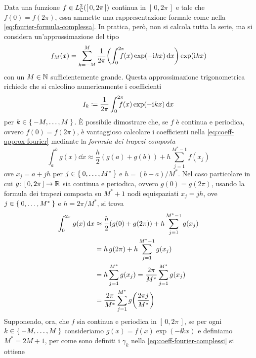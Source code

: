 	Data una funzione \(f \in L_\mathbb{C}^2 ([\, 0, 2 \pi \,])\) continua in \([\, 0, 2 \pi \,]\) e tale che \(f (0) = f (2 \pi)\), essa ammette una rappresentazione formale come nella \eqref{eq:fourier-formula-complessa}. In pratica, però, non si calcola tutta la serie, ma si considera un'approssimazione del tipo
	\begin{equation}\label{eq:funz-fourier-approx}
		f_M (x) = \sum_{k = - M}^M \frac{1}{2 \pi} \qty(\int_0^{\mathrlap{2 \pi}} f (x) \exp (- \ii k x) \dd{x}) \exp (\ii k x)
	\end{equation}
	con un \(M \in \mathbb{N}\) sufficientemente grande. Questa approssimazione trigonometrica richiede che si calcolino numericamente i coefficienti
	\begin{equation}\label{eq:coeff-approx-fourier}
		I_k \coloneqq \frac{1}{2 \pi} \int_0^{\mathrlap{2 \pi}} f (x) \exp (- \ii k x) \dd{x}
	\end{equation}
	per \(k \in \Set{-M, \dots, M}\). È possibile dimostrare che, se \(f\) è continua e periodica, ovvero \(f (0) = f (2 \pi)\), è vantaggioso calcolare i coefficienti nella \eqref{eq:coeff-approx-fourier} mediante la \emph{formula dei trapezi composta}
	\begin{equation*}
		\int_a^b g(x) \dd{x} \approx \frac{h}{2} (g (a) + g (b)) + h \sum_{j = 1}^{M^* - 1} f (x_j)
	\end{equation*}
	ove \(x_j = a + j h\) per \(j \in \Set{0, \dots, M^*}\) e \(h = (b - a) / M^*\). Nel caso particolare in cui \(g \colon [\, 0, 2 \pi \,] \to \mathbb{R}\) sia continua e periodica, ovvero \(g (0) = g (2 \pi)\), usando la formula dei trapezi composta su \(M^* + 1\) nodi equispaziati \(x_j = j h\), ove \(j \in \Set{0, \dots, M^*}\) e \(h = 2 \pi / M^*\), si trova
	\begin{equation*}
		\begin{split}
			\int_0^{2 \pi} g (x) \dd{x} &\approx \frac{h}{2} (g (0) + g (2 \pi)) + h \sum_{j = 1}^{M^* - 1} g (x_j) \\
			&= h \, g (2 \pi) + h \sum_{j = 1}^{M^* - 1} g (x_j) \\
			&= h \sum_{j = 1}^{M^*} g (x_j) = \frac{2 \pi}{M^*} \sum_{j = 1}^{M^*} g (x_j) \\
			&= \frac{2 \pi}{M^*} \sum_{j = 1}^{M^*} g \qty(\frac{2 \pi j}{M^*})
		\end{split}
	\end{equation*}
	Supponendo, ora, che \(f\) sia continua e periodica in \([\, 0, 2 \pi \,]\), se per ogni \(k \in \Set{-M, \dots, M}\) consideriamo \(g (x) = f (x) \exp (- \ii k x)\) e definiamo \(M^* = 2 M + 1\), per come sono definiti i \(\gamma_k\) nella \eqref{eq:coeff-fourier-complessi} si ottiene
